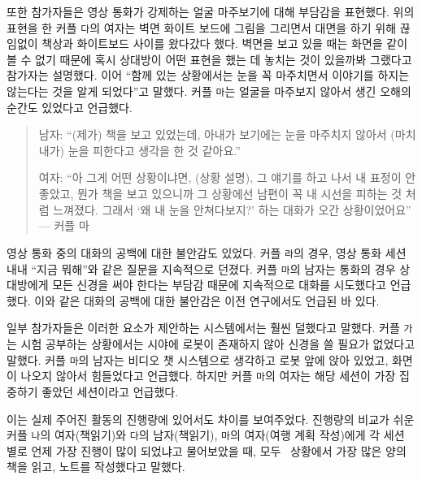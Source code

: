 또한 참가자들은 영상 통화가 강제하는 얼굴 마주보기에 대해 부담감을 표현했다. 위의 표현을 한 커플 \texttt{다}의 여자는 벽면 화이트 보드에 그림을 그리면서 대면을 하기 위해 끊임없이 책상과 화이트보드 사이를 왔다갔다 했다. 벽면을 보고 있을 때는 화면을 같이 볼 수 없기 때문에 혹시 상대방이 어떤 표현을 했는 데 놓치는 것이 있을까봐 그랬다고 참가자는 설명했다. 이어 ``함께 있는 상황에서는 눈을 꼭 마주치면서 이야기를 하지는 않는다는 것을 알게 되었다''고 말했다. 커플 \texttt{마}는 얼굴을 마주보지 않아서 생긴 오해의 순간도 있었다고 언급했다.

\begin{quote}
남자: ``(제가) 책을 보고 있었는데, 아내가 보기에는 눈을 마주치지 않아서 (마치 내가) 눈을 피한다고 생각을 한 것 같아요.''

여자: ``아 그게 어떤 상황이냐면, (상황 설명), 그 얘기를 하고 나서 내 표정이 안좋았고, 뭔가 책을 보고 있으니까 그 상황에선 남편이 꼭 내 시선을 피하는 것 처럼 느껴졌다. 그래서 ‘왜 내 눈을 안쳐다보지?’ 하는 대화가 오간 상황이었어요'' --- 커플 마
\end{quote}

영상 통화 중의 대화의 공백에 대한 불안감도 있었다. 커플 \texttt{라}의 경우, 영상 통화 세션 내내 ``지금 뭐해''와 같은 질문을 지속적으로 던졌다. 커플 \texttt{마}의 남자는 통화의 경우 상대방에게 모든 신경을 써야 한다는 부담감 때문에 지속적으로 대화를 시도했다고 언급했다. 이와 같은 대화의 공백에 대한 불안감은 이전 연구\cite{mclaughlin1982awkward}에서도 언급된 바 있다.

일부 참가자들은 이러한 요소가 제안하는 \sysname 시스템에서는 훨씬 덜했다고 말했다. 커플 \texttt{가}는 시험 공부하는 상황에서는 시야에 로봇이 존재하지 않아 신경을 쓸 필요가 없었다고 말했다. 커플 \texttt{마}의 남자는 \sysname\을 비디오 챗 시스템으로 생각하고 로봇 앞에 앉아 있었고, 화면이 나오지 않아서 힘들었다고 언급했다. 하지만 커플 \texttt{마}의 여자는 해당 세션이 가장 집중하기 좋았던 세션이라고 언급했다.

이는 실제 주어진 활동의 진행량에 있어서도 차이를 보여주었다. 진행량의 비교가 쉬운 커플 \texttt{나}의 여자(책읽기)와 \texttt{다}의 남자(책읽기), \texttt{마}의 여자(여행 계획 작성)에게 각 세션 별로 언제 가장 진행이 많이 되었냐고 물어보았을 때, 모두 \sysname\ 상황에서 가장 많은 양의 책을 읽고, 노트를 작성했다고 말했다.



